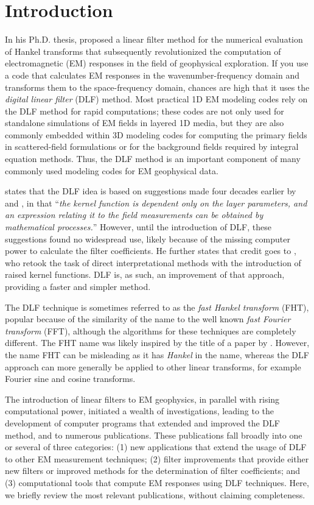 \documentclass[paper,twocolumn,twoside]{geophysics}
\begin{document}
\section{Introduction}

In his Ph.D. thesis, \cite{PhD.70.Ghosh} proposed a linear filter method for
the numerical evaluation of Hankel transforms that subsequently revolutionized
the computation of electromagnetic (EM) responses in the field of geophysical
exploration. If you use a code that calculates EM responses in the
wavenumber-frequency domain and transforms them to the space-frequency domain,
chances are high that it uses the \emph{digital linear filter} (DLF) method.
Most practical 1D EM modeling codes rely on the DLF method for rapid
computations; these codes are not only used for standalone simulations of EM
fields in layered 1D media, but they are also commonly embedded within 3D
modeling codes for computing the primary fields in scattered-field formulations
or for the background fields required by integral equation methods. Thus, the
DLF method is an important component of many commonly used modeling codes for
EM geophysical data.

\cite{GP.71.Ghosh} states that the DLF idea is based on suggestions made four
decades earlier by \cite{PHY.33.Slichter} and \cite{GEO.40.Pekeris}, in that
``\emph{the kernel function is dependent only on the layer parameters, and an
expression relating it to the field measurements can be obtained by
mathematical processes.}'' However, until the introduction of DLF, these
suggestions found no widespread use, likely because of the missing computer
power to calculate the filter coefficients. He further states that credit goes
to \cite{BK.68.Koefoed, GP.70.Koefoed}, who retook the task of direct
interpretational methods with the introduction of raised kernel functions. DLF
is, as such, an improvement of that approach, providing a faster and simpler
method.

The DLF technique is sometimes referred to as the \emph{fast Hankel transform}
(FHT), popular because of the similarity of the name to the well known
\emph{fast Fourier transform} (FFT), although the algorithms for these
techniques are completely different. The FHT name was likely inspired by the
title of a paper by \cite{GP.79.Johansen}. However, the name FHT can be
misleading as it has \emph{Hankel} in the name, whereas the DLF approach can
more generally be applied to other linear transforms, for example Fourier sine
and cosine transforms.

The introduction of linear filters to EM geophysics, in parallel with rising
computational power, initiated a wealth of investigations, leading to the
development of computer programs that extended and improved the DLF method, and
to numerous publications. These publications fall broadly into one or several
of three categories: (1) new applications that extend the usage of DLF to other
EM measurement techniques; (2) filter improvements that provide either new
filters or improved methods for the determination of filter coefficients; and
(3) computational tools that compute EM responses using DLF techniques. Here,
we briefly review the most relevant publications, without claiming
completeness.
\end{document}
